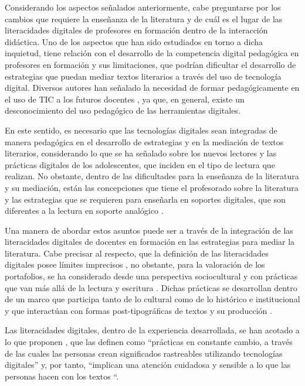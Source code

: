 	Considerando los aspectos señalados anteriormente, cabe preguntarse por
	los cambios que requiere la enseñanza de la literatura y de cuál es el
	lugar de las literacidades digitales de profesores en formación dentro
	de la interacción didáctica. Uno de los aspectos que han sido estudiados
	en torno a dicha inquietud, tiene relación con el desarrollo de la
	competencia digital pedagógica en profesores en formación y sus
	limitaciones, que podrían dificultar el desarrollo de estrategias que
	puedan mediar textos literarios a través del uso de tecnología digital.
	Diversos autores han señalado la necesidad de formar pedagógicamente en
	el uso de TIC a los futuros docentes \cite{ayala2015,sandoval-rubilar_alveal_fuentes_2017,Silva_Morales_Lázaro-Cantabrana_Gisbert_Miranda_Rivoir_Onetto_2019},
	ya que, en general, existe un desconocimiento del uso pedagógico de las
	herramientas digitales.
	
	En este sentido, es necesario que las tecnologías digitales sean
	integradas de manera pedagógica en el desarrollo de estrategias y en la
	mediación de textos literarios, considerando lo que se ha señalado sobre
	los nuevos lectores y las prácticas digitales de los adolescentes, que
	inciden en el tipo de lectura que realizan. No obstante, dentro de las
	dificultades para la enseñanza de la literatura y su mediación, están
	las concepciones que tiene el profesorado sobre la literatura \cite{barra2022} y las estrategias que se requieren para enseñarla
	en soportes digitales, que son diferentes a la lectura en soporte
	analógico \cite{ryan_2004}.
	
	Una manera de abordar estos asuntos puede ser a través de la integración
	de las literacidades digitales de docentes en formación en las
	estrategias para mediar la literatura. Cabe precisar al respecto, que la
	definición de las literacidades digitales posee límites imprecisos
	\cite{manghi_haquin_2016,villar_onrubia_morini_marin_nascimbeni_2022},
	no obstante, para la valoración de los portafolios, se ha considerado
	desde una perspectiva sociocultural y con prácticas que van más allá de
	la lectura y escritura \cite{villar_onrubia_morini_marin_nascimbeni_2022}. Dichas
	prácticas se desarrollan dentro de un marco que participa tanto de lo
	cultural como de lo histórico e institucional \cite{gee2015} y que
	interactúan con formas post-tipográficas de textos y su producción
	\cite{lankshear_knobel_2008}.
	
	Las literacidades digitales, dentro de la experiencia desarrollada, se
	han acotado a lo que proponen \textcite[p. 9]{gillen_barton_2010}, que las definen como
	``prácticas en constante cambio, a través de las cuales las personas
	crean significados rastreables utilizando tecnologías digitales'' y, por
	tanto, ``implican una atención cuidadosa y sensible a lo que las
	personas hacen con los textos ``.
	
